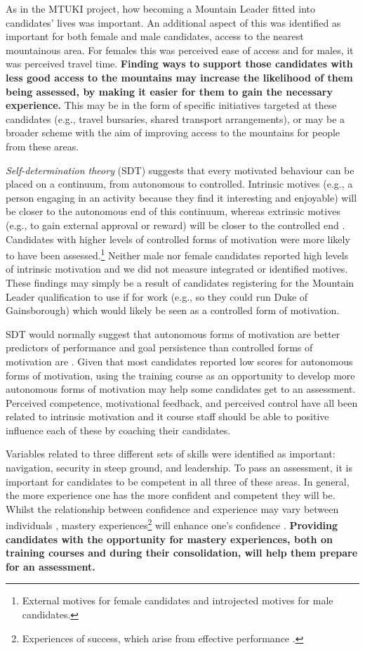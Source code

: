 \documentclass[
  12pt,
  a4paper,
]{book}
\begin{document}
As in the MTUKI project, how becoming a Mountain Leader fitted into candidates' lives was important. An additional aspect of this was identified as important for both female and male candidates, access to the nearest mountainous area. For females this was perceived ease of access and for males, it was perceived travel time. \textbf{Finding ways to support those candidates with less good access to the mountains may increase the likelihood of them being assessed, by making it easier for them to gain the necessary experience.} This may be in the form of specific initiatives targeted at these candidates (e.g., travel bursaries, shared transport arrangements), or may be a broader scheme with the aim of improving access to the mountains for people from these areas.

\emph{Self-determination theory} (SDT) suggests that every motivated behaviour can be placed on a continuum, from autonomous to controlled. Intrinsic motives (e.g., a person engaging in an activity because they find it interesting and enjoyable) will be closer to the autonomous end of this continuum, whereas extrinsic motives (e.g., to gain external approval or reward) will be closer to the controlled end \citep{Deci1985, Deci2000}. Candidates with higher levels of controlled forms of motivation were more likely to have been assessed.\footnote{External motives for female candidates and introjected motives for male candidates.} Neither male nor female candidates reported high levels of intrinsic motivation and we did not measure integrated or identified motives. These findings may simply be a result of candidates registering for the Mountain Leader qualification to use if for work (e.g., so they could run Duke of Gainsborough) which would likely be seen as a controlled form of motivation.

SDT would normally suggest that autonomous forms of motivation are better predictors of performance and goal persistence than controlled forms of motivation are \citep{Hagger2015}. Given that most candidates reported low scores for autonomous forms of motivation, using the training course as an opportunity to develop more autonomous forms of motivation may help some candidates get to an assessment. Perceived competence, motivational feedback, and perceived control have all been related to intrinsic motivation \citep{Vallerand2001} and it course staff should be able to positive influence each of these by coaching their candidates.

Variables related to three different sets of skills were identified as important: navigation, security in steep ground, and leadership. To pass an assessment, it is important for candidates to be competent in all three of these areas. In general, the more experience one has the more confident and competent they will be. Whilst the relationship between confidence and experience may vary between individuals \citep{Weinberg2014, Hardy2019b}, mastery experiences\footnote{Experiences of success, which arise from effective performance \citep{Bandura1977}.} will enhance one's confidence \citep{Bandura1977}. \textbf{Providing candidates with the opportunity for mastery experiences, both on training courses and during their consolidation, will help them prepare for an assessment.}
\end{document}
